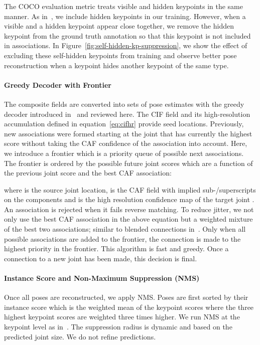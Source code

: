 \documentclass[journal]{IEEEtran}
\begin{document}
The COCO evaluation metric treats visible and hidden keypoints
in the same manner. As in~\cite{kreiss2019pifpaf}, we include
hidden keypoints in our training. However, when a visible
and a hidden keypoint appear close together, we remove the hidden
keypoint from the ground truth annotation so that this keypoint
is not included in associations.
In Figure~\ref{fig:self-hidden-kp-suppression}, we show the
effect of excluding these self-hidden keypoints from training
and observe better pose reconstruction when a keypoint hides
another keypoint of the same type.



\paragraph{Greedy Decoder with Frontier}

The composite fields are converted into sets of pose estimates
with the greedy decoder introduced in~\cite{kreiss2019pifpaf} and reviewed here.
The CIF field and its high-resolution accumulation 
defined in equation~\ref{eq:cifhr} provide seed locations.
Previously, new associations were formed starting at the joint
that has currently the highest score without taking
the CAF confidence of the association into account.
Here, we introduce a frontier which is a priority queue of
possible next associations.
The frontier is ordered by the possible future joint scores which are a function
of the previous joint score and the best CAF association:

where  is the source joint location,  is the CAF field with implied sub-/superscripts on the components
and  is the high resolution confidence map of the target joint .
An association is rejected when it fails reverse matching.
To reduce jitter, we not only use the best CAF association in the above equation but a weighted mixture of the best two associations; similar to blended connections
in~\cite{bazarevsky2019blazeface}.
Only when
all possible associations are added to the frontier,
the connection is made to the highest priority in the frontier.
This algorithm is fast and greedy. Once a connection to a new
joint has been made, this decision is final.

\paragraph{Instance Score and Non-Maximum Suppression (NMS)}
Once all poses are reconstructed, we apply NMS. Poses are first sorted by
their instance score which is the weighted mean of the keypoint scores where the three
highest keypoint scores are weighted three times higher.
We run NMS at the keypoint level as in~\cite{kreiss2019pifpaf,papandreou2018personlab}.
The suppression radius is dynamic and based on the predicted joint size.
We do not refine predictions.
\end{document}

